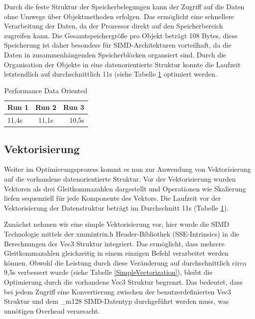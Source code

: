 \documentclass[sigconf]{acmart}
\begin{document}
Durch die feste Struktur der Speicherbelegungen kann der Zugriff auf die Daten ohne Umwege über Objektmethoden erfolgen.
Das ermöglicht eine schnellere Verarbeitung der Daten, da der Prozessor direkt auf den Speicherbereich zugreifen kann.
Die Gesamtspeichergröße pro Objekt beträgt 108 Bytes, diese Speicherung ist daher besonders für SIMD-Architekturen vorteilhaft, da die Daten in zusammenhängenden Speicherblöcken organsiert sind.
Durch die Organisation der Objekte in eine datenorientierte Struktur konnte die Laufzeit letztendlich auf durchschnittlich 11s (siehe Tabelle \ref{DataOriented} optimiert werden.

\begin{table}[t]
    \caption{Performance Data Oriented}
   
    \label{DataOriented}
    \centering
    \small
    \begin{tabular}[h]{lcr}
        \toprule
        Run 1 & Run 2 & Run 3\\
        \midrule
         11,4s & 11,1s & 10,5s\\
         \bottomrule
    \end{tabular}
\end{table}

\subsection{Vektorisierung} \label{Vektorisierung}
Weiter im Optimierungsprozess kommt es nun zur Anwendung von Vektorisierung auf die vorhandene datenorientierte Struktur. Vor der Vektorisierung wurden Vektoren als drei Gleitkommazahlen dargestellt und Operationen wie Skalierung liefen sequenziell für jede Komponente des Vektors.
Die Laufzeit vor der Vektorisierung der Datenstruktur beträgt im Durchschnitt 11s (Tabelle \ref{DataOriented}).

Zunächst nehmen wir eine simple Vektorisierung vor, hier wurde die SIMD Technologie mittels der xmmintrin.h Header-Bibliothek (SSE-Intrinsics) in die Berechnungen der Vec3 Struktur integriert.
Das ermöglicht, dass mehrere Gleitkommazahlen gleichzeitig in einem einzigen Befehl verarbeitet werden können.
Obwohl die Leistung durch diese Veränderung auf durchschnittlich circa 9,5s verbessert wurde (siehe Tabelle \ref{SimpleVectorization}), bleibt die Optimierung durch die vorhandene Vec3 Struktur begrenzt.
Das bedeutet, dass bei jedem Zugriff eine Konvertierung zwischen der benutzerdefinierten Vec3 Struktur und dem \_m128 SIMD-Datentyp durchgeführt werden muss, was unnötigen Overhead verursacht.
\end{document}
